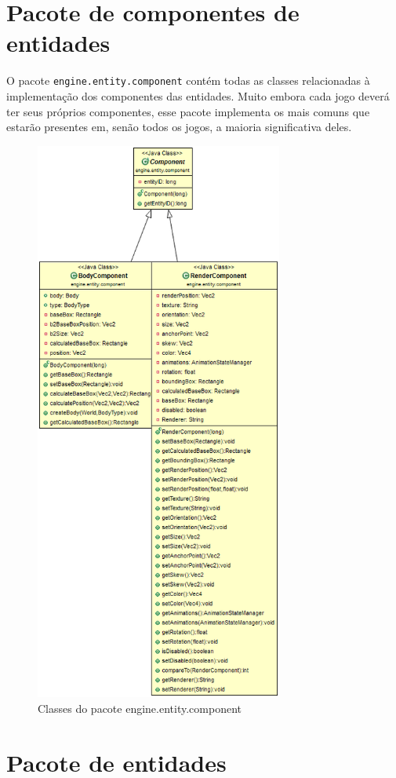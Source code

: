 \documentclass[12pt, 
openright, 
oneside, 
a4paper,    
brazil]{facom-ufu-abntex2}
\begin{document}
\section{Pacote de componentes de entidades}

O pacote \texttt{engine.entity.component} contém todas as classes relacionadas à implementação dos componentes das entidades. Muito embora cada jogo deverá ter seus próprios componentes, esse pacote implementa os mais comuns que estarão presentes em, senão todos os jogos, a maioria significativa deles.

\begin{figure}[H]
	\centering
	\includegraphics[width=22em]{imagens/engine.entity.component.png}
	\caption{Classes do pacote engine.entity.component}
\end{figure}

\section{Pacote de entidades}
\end{document}
